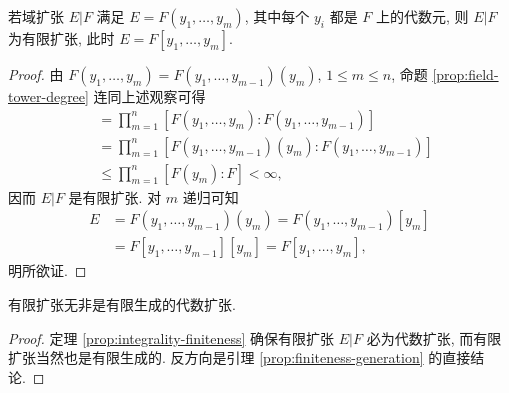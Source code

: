 \begin{lemma}\label{prop:finiteness-generation}
	若域扩张 $E|F$ 满足 $E=F(y_1, \ldots, y_m)$, 其中每个 $y_i$ 都是 $F$ 上的代数元, 则 $E|F$ 为有限扩张, 此时 $E=F[y_1, \ldots, y_m]$.
\end{lemma}
\begin{proof}
	由 $F(y_1, \ldots, y_m) = F(y_1, \ldots, y_{m-1})(y_m)$, $1 \leq m \leq n$, 命题 \ref{prop:field-tower-degree} 连同上述观察可得
	\begin{align*}
		[F(y_1, \ldots, y_n):F] & = \prod_{m=1}^n \left[ F(y_1, \ldots, y_m): F(y_1, \ldots, y_{m-1}) \right] \\
		& = \prod_{m=1}^n \left[ F(y_1, \ldots, y_{m-1})(y_m): F(y_1, \ldots, y_{m-1}) \right] \\
		& \leq \prod_{m=1}^n [F(y_m):F] < \infty,
	\end{align*}
	因而 $E|F$ 是有限扩张. 对 $m$ 递归可知
	\begin{equation*}\begin{aligned}
		E & = F(y_1, \ldots, y_{m-1})(y_m) = F(y_1, \ldots, y_{m-1})[y_m] \\
		& = F[y_1, \ldots, y_{m-1}][y_m] = F[y_1, \ldots, y_m],
	\end{aligned}\end{equation*}
	明所欲证.
\end{proof}

\begin{lemma}\label{prop:finite-vs-algebraic}
	有限扩张无非是有限生成的代数扩张.
\end{lemma}
\begin{proof}
	定理 \ref{prop:integrality-finiteness} 确保有限扩张 $E|F$ 必为代数扩张, 而有限扩张当然也是有限生成的. 反方向是引理 \ref{prop:finiteness-generation} 的直接结论.
\end{proof}

